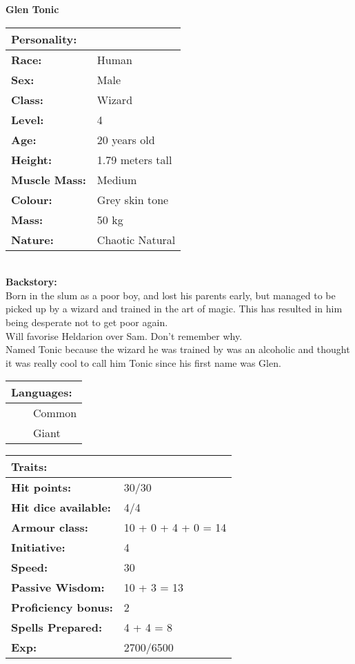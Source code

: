 \documentclass[11pt]{article}
\newcommand{\tabitem}{~~\llap{--}~~}
\begin{document}
	\begin{center}
\Huge \textbf{Glen Tonic}
	\end{center}
	\begin{multicols}{2}
\noindent \begin{tabularx}{95mm}{@{}l l}
\Large \textbf{Personality:} 	& 					\\
\hline
\textbf{Race:} 					& Human 			\\
\textbf{Sex:} 					& Male 				\\
\textbf{Class:}					& Wizard			\\
\textbf{Level:} 				& 4 	 			\\
\textbf{Age:} 					& 20 years old 		\\
\textbf{Height:} 				& 1.79 meters tall 	\\
\textbf{Muscle Mass:} 			& Medium 			\\
\textbf{Colour:} 				& Grey skin tone 	\\
\textbf{Mass:} 					& 50 kg 			\\
\textbf{Nature:} 				& Chaotic Natural
		\end{tabularx} \\
\textbf{Backstory:} \\
Born in the slum as a poor boy, and lost his parents early, but managed to be picked up by a wizard and trained in the art of magic. This has resulted in him being desperate not to get poor again. \\
Will favorise Heldarion over Sam. Don't remember why. \\
Named Tonic because the wizard he was trained by was an alcoholic and thought it was really cool to call him Tonic since his first name was Glen. \\

\noindent \begin{tabularx}{95mm}{@{}l}
{\Large \textbf{Languages:}} \\
\hline
\tabitem Common \\
\tabitem Giant
		\end{tabularx}

\vspace{4mm}

\noindent \begin{tabularx}{95mm}{@{}l l}
\Large \textbf{Traits:}		 	& 							\\
\hline
\textbf{Hit points:} 			& 30/30 					\\
\textbf{Hit dice available:}	& 4/4						\\
\textbf{Armour class:} 			& 10 + 0 + 4 + 0 = 14 		\\
\textbf{Initiative:} 			& 4	 						\\
\textbf{Speed:} 				& 30		 				\\
\textbf{Passive Wisdom:} 		& 10 + 3 = 13	 			\\
\textbf{Proficiency bonus:}		& 2							\\
\textbf{Spells Prepared:} 		& 4 + 4 = 8		 			\\
\textbf{Exp:} 					& 2700/6500
		\end{tabularx}


\end{multicols}
\end{document}
